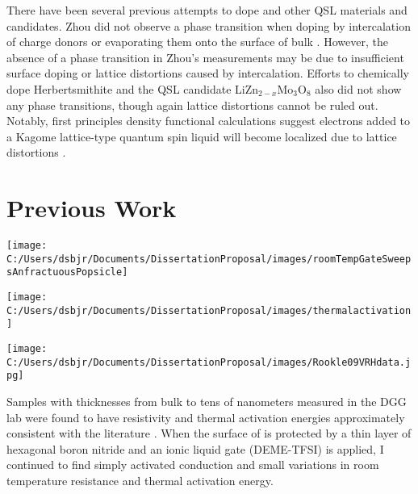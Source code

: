 \documentclass[11pt]{article}
\newenvironment{Figure}
  {\par\medskip\noindent\minipage{\linewidth}}
  {\endminipage\par\medskip}
\begin{document}
\begin{multicols}{2}
There have been several previous attempts to dope \rucl and other QSL materials and candidates. Zhou did not observe a phase transition when doping \rucl by intercalation of charge donors or evaporating them onto the surface of bulk \rucl \cite{Zhou2016}. However, the absence of a phase transition in Zhou's measurements may be due to insufficient surface doping or lattice distortions caused by intercalation. Efforts to chemically dope Herbertsmithite \cite{Kelly2016} and the QSL candidate LiZn$_{2-x}$Mo$_{3}$O$_{8}$ \cite{Sheckelton2015} also did not show any phase transitions, though again lattice distortions cannot be ruled out. Notably, first principles density functional calculations suggest electrons added to a Kagome lattice-type quantum spin liquid will become localized due to lattice distortions \cite{Liu2018}.

\section{Previous Work}

\begin{Figure}
\centering
  {\texttt{[image: C:/Users/dsbjr/Documents/DissertationProposal/images/roomTempGateSweepsAnfractuousPopsicle]}\label{fig:f1}}
\end{Figure}

\begin{Figure}  
  {\texttt{[image: C:/Users/dsbjr/Documents/DissertationProposal/images/thermalactivation]}\label{fig:f2}}
\end{Figure}

\begin{Figure}
		{\texttt{[image: C:/Users/dsbjr/Documents/DissertationProposal/images/Rookle09VRHdata.jpg]}\label{fig:f3}}
\end{Figure}

Samples with thicknesses from bulk to tens of nanometers measured in the DGG lab were found to have resistivity and thermal activation energies approximately consistent with the literature \cite{Rojas1983}. When the surface of \rucl is protected by a thin layer of hexagonal boron nitride and an ionic liquid gate (DEME-TFSI) is applied, I continued to find simply activated conduction and small variations in room temperature resistance and thermal activation energy.


\end{multicols}
\end{document}
